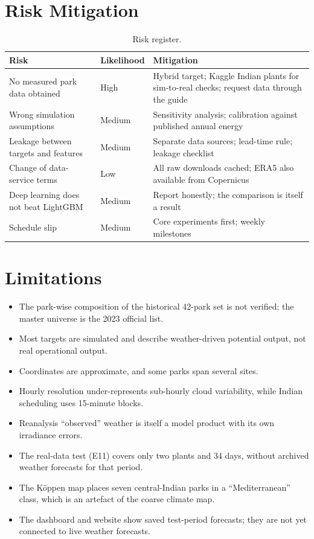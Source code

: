 \documentclass[12pt]{report}
\begin{document}
\section{Risk Mitigation}
\vspace{1mm}
\begin{table}[htbp]
\centering
\caption{Risk register.}
\label{tab:risk}
\begin{tabularx}{\textwidth}{p{4.3cm}p{1.6cm}L}
\toprule
Risk & Likelihood & Mitigation \\
\midrule
No measured park data obtained & High & Hybrid target; Kaggle Indian plants for sim-to-real checks; request data through the guide \\
Wrong simulation assumptions & Medium & Sensitivity analysis; calibration against published annual energy \\
Leakage between targets and features & Medium & Separate data sources; lead-time rule; leakage checklist \\
Change of data-service terms & Low & All raw downloads cached; ERA5 also available from Copernicus \\
Deep learning does not beat LightGBM & Medium & Report honestly; the comparison is itself a result \\
Schedule slip & Medium & Core experiments first; weekly milestones \\
\bottomrule
\end{tabularx}
\end{table}

\section{Limitations}
\vspace{1mm}
\begin{itemize}[noitemsep]
    \item The park-wise composition of the historical 42-park set is not verified; the master universe is the 2023 official list.
    \item Most targets are simulated and describe weather-driven potential output, not real operational output.
    \item Coordinates are approximate, and some parks span several sites.
    \item Hourly resolution under-represents sub-hourly cloud variability, while Indian scheduling uses 15-minute blocks.
    \item Reanalysis ``observed'' weather is itself a model product with its own irradiance errors.
    \item The real-data test (E11) covers only two plants and 34 days, without archived weather forecasts for that period.
    \item The Köppen map places seven central-Indian parks in a ``Mediterranean'' class, which is an artefact of the coarse climate map.
    \item The dashboard and website show saved test-period forecasts; they are not yet connected to live weather forecasts.
\end{itemize}
\end{document}

